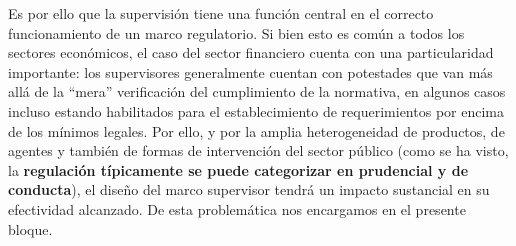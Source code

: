 \documentclass[10pt,a4paper]{article}
\begin{document}
Es por ello que la supervisión tiene una función central en el correcto funcionamiento de un marco regulatorio. Si bien esto es común a todos los sectores económicos, el caso del sector financiero cuenta con una particularidad importante: los supervisores generalmente cuentan con potestades que van más allá de la “mera” verificación del cumplimiento de la normativa, en algunos casos incluso estando habilitados para el establecimiento de requerimientos por encima de los mínimos legales. Por ello, y por la amplia heterogeneidad de productos, de agentes y también de formas de intervención del sector público (como se ha visto, la \textbf{regulación típicamente se puede categorizar en prudencial y de conducta}), el diseño del marco supervisor tendrá un impacto sustancial en su efectividad alcanzado. De esta problemática nos encargamos en el presente bloque.
\end{document}
